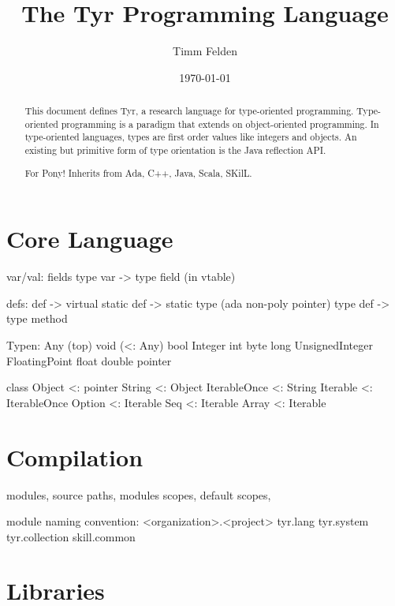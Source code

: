 \documentclass[a4paper,10pt]{article}
\title{The Tyr Programming Language}
\author{Timm Felden}
\date{\today}
\begin{document}
\maketitle

\begin{abstract}
This document defines Tyr, a research language for type-oriented programming.
Type-oriented programming is a paradigm that extends on object-oriented programming.
In type-oriented languages, types are first order values like integers and objects.
An existing but primitive form of type orientation is the Java reflection API.
\end{abstract}

\renewcommand{\abstractname}{Acknowledgements}
\begin{abstract}
For Pony!
Inherits from Ada, C++, Java, Scala, SKilL.
\end{abstract}

\tableofcontents

\newpage
\part{Core Language}
\label{part:spec}





var/val:
  fields
  type var -> type field (in vtable)

defs:
 def -> virtual
 static def -> static type (ada non-poly pointer)
 type def -> type method


Typen:
 Any (top)
 void (<: Any)
 bool
 Integer
 int
 byte
 long
 UnsignedInteger
 FloatingPoint
 float
 double
 pointer
 
class Object <: pointer
  String <: Object
  IterableOnce <: String
  Iterable <: IterableOnce
  Option <: Iterable
  Seq <: Iterable
  Array <: Iterable


\part{Compilation}

modules,
source paths,
modules scopes,
default scopes,


module naming convention:
<organization>.<project>
tyr.lang
tyr.system
tyr.collection
skill.common


\part{Libraries}
\end{document}
